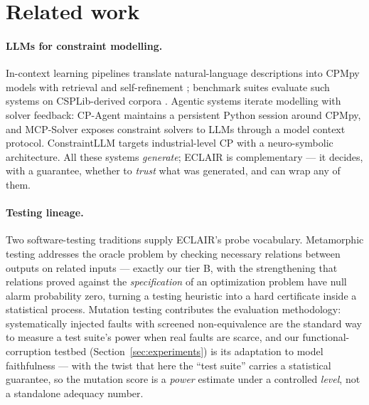 \documentclass[pdflatex,sn-mathphys-num]{sn-jnl}
\theoremstyle{thmstyleone}
\theoremstyle{thmstyletwo}
\begin{document}
\section{Related work}\label{sec:related}

\paragraph{LLMs for constraint modelling.}
In-context learning pipelines translate natural-language descriptions
into CPMpy models with retrieval and self-refinement
\cite{michailidis2024icl}; benchmark suites evaluate such systems on
CSPLib-derived corpora \cite{michailidis2025cpbench}. Agentic systems
iterate modelling with solver feedback: CP-Agent
\cite{szeider2025cpagent} maintains a persistent Python session around
CPMpy, and MCP-Solver \cite{szeider2025mcp} exposes constraint solvers
to LLMs through a model context protocol. ConstraintLLM
\cite{shi2025constraintllm} targets industrial-level CP with a
neuro-symbolic architecture. All these systems \emph{generate};
ECLAIR is complementary --- it decides, with a guarantee, whether to
\emph{trust} what was generated, and can wrap any of them.

\paragraph{Testing lineage.}
Two software-testing traditions supply ECLAIR's probe vocabulary.
Metamorphic testing \cite{chen2018metamorphic} addresses the oracle
problem by checking necessary relations between outputs on related
inputs --- exactly our tier B, with the strengthening that relations
proved against the \emph{specification} of an optimization problem
have null alarm probability zero, turning a testing heuristic into a
hard certificate inside a statistical process. Mutation testing
\cite{demillo1978hints, jia2011mutation} contributes the evaluation
methodology: systematically injected faults with screened
non-equivalence are the standard way to measure a test suite's power
when real faults are scarce, and our functional-corruption testbed
(Section~\ref{sec:experiments}) is its adaptation to model
faithfulness --- with the twist that here the ``test suite'' carries
a statistical guarantee, so the mutation score is a \emph{power}
estimate under a controlled \emph{level}, not a standalone adequacy
number.
\end{document}
